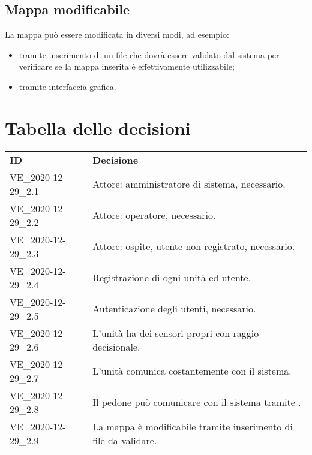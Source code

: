 \documentclass[]{article}
\begin{document}
		\subsection{Mappa modificabile}
		La mappa può essere modificata in diversi modi, ad esempio:
		\begin{itemize}
			\item tramite inserimento di un file che dovrà essere validato dal sistema per verificare se la mappa inserita è effettivamente utilizzabile;
			\item tramite interfaccia grafica.
		\end{itemize}

	\newpage

	\section{Tabella delle decisioni}

\begin{table} [h!]
	\begin{center}
		\begin{tabular} { m{2cm} m{14cm} }
			\rowcolor{lightgray}
			\textbf{ID} & \textbf{Decisione}\\
			VE\_2020-12-29\_2.1 & Attore: amministratore di sistema, necessario.\\
			VE\_2020-12-29\_2.2 & Attore: operatore, necessario. \\
			VE\_2020-12-29\_2.3 & Attore: ospite, utente non registrato, necessario. \\
			VE\_2020-12-29\_2.4 & Registrazione di ogni unità ed utente. \\
			VE\_2020-12-29\_2.5 & Autenticazione degli utenti, necessario. \\
			VE\_2020-12-29\_2.6 & L'unità ha dei sensori propri con raggio decisionale. \\
			VE\_2020-12-29\_2.7 & L'unità comunica costantemente con il sistema.\\
			VE\_2020-12-29\_2.8 & Il pedone può comunicare con il sistema tramite \glock{Bluetooth}.\\
			VE\_2020-12-29\_2.9 & La mappa è modificabile tramite inserimento di file da validare.
		\end{tabular}
	\end{center}
\end{table}
\end{document}
